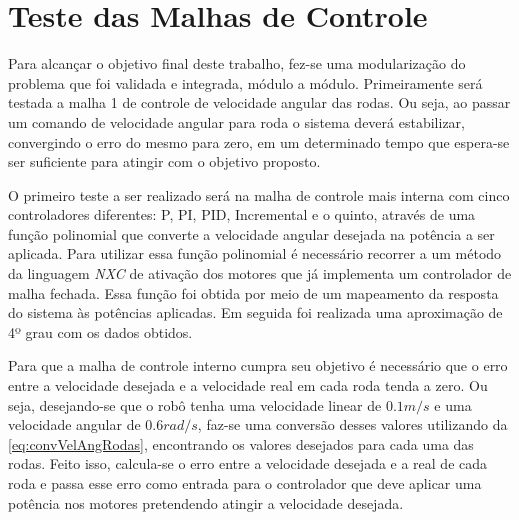 \chapter{Teste das Malhas de Controle}
\label{chap:testesMalhas}
Para alcançar o objetivo final deste trabalho, fez-se uma modularização do problema que foi validada e integrada, módulo a módulo. Primeiramente será testada a malha 1 de controle de velocidade angular das rodas. %
Ou seja, ao passar um comando de velocidade angular para roda o sistema deverá estabilizar, convergindo o erro do mesmo para zero, em um determinado tempo que espera-se ser suficiente para atingir com o objetivo proposto.

O primeiro teste a ser realizado será na malha de controle mais interna com cinco controladores diferentes: P, PI, PID, Incremental e o quinto, através de uma função polinomial que converte a velocidade angular desejada na potência a ser aplicada. Para utilizar essa função polinomial é necessário recorrer a um método da linguagem \emph{NXC} de ativação dos motores que já implementa um controlador de malha fechada. Essa função foi obtida por meio de um mapeamento da resposta do sistema às potências aplicadas. Em seguida foi realizada uma aproximação de 4º grau com os dados obtidos.

Para que a malha de controle interno cumpra seu objetivo é necessário que o erro entre a velocidade desejada e a velocidade real em cada roda tenda a zero. Ou seja, desejando-se que o robô tenha uma velocidade linear de $0.1 m/s$ e uma velocidade angular de $0.6 rad/s$, faz-se uma conversão desses valores utilizando da \autoref{eq:convVelAngRodas}, encontrando os valores desejados para cada uma das rodas. Feito isso, calcula-se o erro entre a velocidade desejada e a real de cada roda e passa esse erro como entrada para o controlador que deve aplicar uma potência nos motores pretendendo atingir a velocidade desejada.

